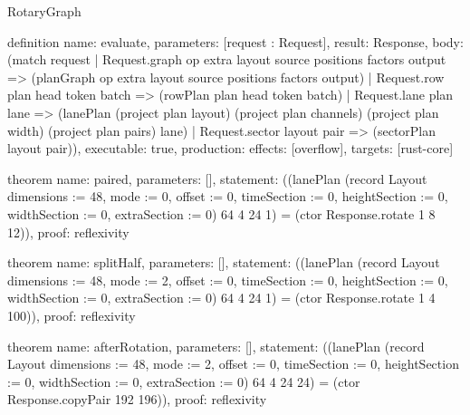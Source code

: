 \begin{lexlean}{RotaryGraph}
\begin{semanticmodule}
definition{
  name: evaluate,
  parameters: [request : Request],
  result: Response,
  body: (match request
    | Request.graph op extra layout source positions factors output => (planGraph op extra layout source positions factors output)
    | Request.row plan head token batch => (rowPlan plan head token batch)
    | Request.lane plan lane => (lanePlan (project plan layout) (project plan channels) (project plan width) (project plan pairs) lane)
    | Request.sector layout pair => (sectorPlan layout pair)),
  executable: true,
  production: {effects: [overflow], targets: [rust-core]}
}

theorem{
  name: paired,
  parameters: [],
  statement: ((lanePlan (record Layout {dimensions := 48, mode := 0, offset := 0, timeSection := 0, heightSection := 0, widthSection := 0, extraSection := 0}) 64 4 24 1) = (ctor Response.rotate 1 8 12)),
  proof: reflexivity{}
}

theorem{
  name: splitHalf,
  parameters: [],
  statement: ((lanePlan (record Layout {dimensions := 48, mode := 2, offset := 0, timeSection := 0, heightSection := 0, widthSection := 0, extraSection := 0}) 64 4 24 1) = (ctor Response.rotate 1 4 100)),
  proof: reflexivity{}
}

theorem{
  name: afterRotation,
  parameters: [],
  statement: ((lanePlan (record Layout {dimensions := 48, mode := 2, offset := 0, timeSection := 0, heightSection := 0, widthSection := 0, extraSection := 0}) 64 4 24 24) = (ctor Response.copyPair 192 196)),
  proof: reflexivity{}
}
\end{semanticmodule}
\end{lexlean}
